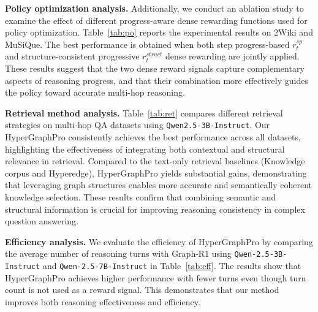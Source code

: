 


\noindent\textbf{Policy optimization analysis.}
Additionally, we conduct an ablation study to examine the effect of different progress-aware dense rewarding functions used for policy optimization.
Table~\ref{tab:po} reports the experimental results on 2Wiki and MuSiQue.
The best performance is obtained when both step progress-based $r_t^{sp}$ and structure-consistent progressive $r_t^{struct}$ dense rewarding are jointly applied.
These results suggest that the two dense reward signals capture complementary aspects of reasoning progress, and that their combination more effectively guides the policy toward accurate multi-hop reasoning.

\noindent\textbf{Retrieval method analysis.}
Table~\ref{tab:ret} compares different retrieval strategies on multi-hop QA datasets using \texttt{Qwen2.5-3B-Instruct}.
Our HyperGraphPro consistently achieves the best performance across all datasets, highlighting the effectiveness of integrating both contextual and structural relevance in retrieval.
Compared to the text-only retrieval baselines (Knowledge corpus and Hyperedge), HyperGraphPro yields substantial gains, demonstrating that leveraging graph structures enables more accurate and semantically coherent knowledge selection.
These results confirm that combining semantic and structural information is crucial for improving reasoning consistency in complex question answering.

\noindent\textbf{Efficiency analysis.}
We evaluate the efficiency of HyperGraphPro by comparing the average number of reasoning turns with Graph-R1 using \texttt{Qwen-2.5-3B-Instruct} and \texttt{Qwen-2.5-7B-Instruct}  in Table~\ref{tab:eff}.
The results show that HyperGraphPro achieves higher performance with fewer turns even though turn count is not used as a reward signal.
This demonstrates that our method improves both reasoning effectiveness and efficiency.

